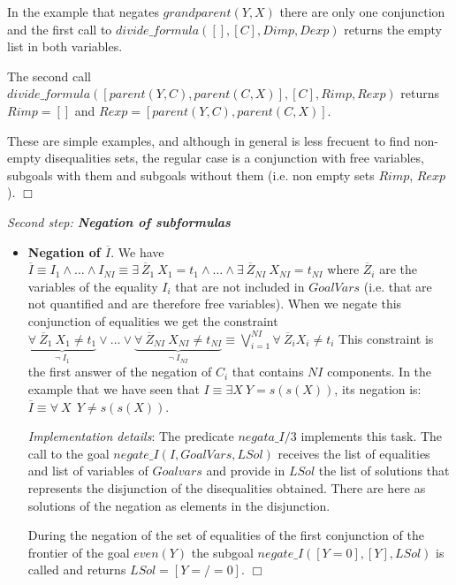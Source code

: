 \documentclass{tlp}
\begin{document}
In the example that negates $grandparent(Y,X)$ there are only one conjunction
and the first call to $divide\_formula([],[C],Dimp,Dexp)$ returns the empty
list in both variables. 

The second call $divide\_formula([parent(Y,C),parent(C,X)],[C],Rimp,Rexp)$
returns $Rimp=[]$ and $Rexp=[parent(Y,C),parent(C,X)]$.

These are simple examples, and although in general is less frecuent to find
non-empty disequalities sets, the regular case is a conjunction with free
variables, subgoals with them and subgoals without them (i.e. non empty sets
$Rimp$, $Rexp$). $\Box$
\medskip

\noindent
{\em Second step: {\bf Negation of subformulas}}

        \begin{itemize}

           \item {\bf Negation of $\overline{I}$}. We have $\overline{I}
           \equiv I_1 \wedge \ldots \wedge I_{NI} \equiv \exists~
           \overline{Z}_1~ X_1 = t_1 \wedge \ldots \wedge \exists~
           \overline{Z}_{NI}~ X_{NI} = t_{NI} $ where
           $\overline{Z}_i$ are the variables of the equality $I_i$ that
           are not included in $GoalVars$ (i.e. that are not quantified
           and are therefore free variables). When we negate this
           conjunction of equalities we get the constraint 
                $
           \underbrace{\forall~ \overline{Z}_1~ X_1 \neq t_1} _{\neg~
           I_1} \vee \ldots \vee \underbrace{\forall~
           \overline{Z}_{NI}~ X_{NI} \neq t_{NI} } _{\neg~ I_{NI}}
           \equiv %
           \bigvee_{i=1}^{NI} \forall~ \overline{Z}_i X_i
           \neq t_i $ 
           This constraint is the first answer of the negation of $C_i$ that
           contains $NI$ components.  In the example that we have seen that $
           I \equiv \exists X ~ Y=s(s(X))$, its negation is: $\overline{I}
           \equiv \forall~ X~~ Y \neq s(s(X))$.

\noindent
\emph{Implementation details}: The predicate $negata\_I/3$ implements this
task. The call to the goal $negate\_I(I,GoalVars,LSol)$ receives the list of
equalities and list of variables of $Goalvars$ and provide in $LSol$ the list
of solutions that represents the disjunction of the disequalities
obtained. There are here as solutions of the negation as elements in the
disjunction.   

During the negation of the set of equalities of the first conjunction of the
frontier of the goal $even(Y)$ the subgoal $negate\_I([Y=0],[Y],LSol)$ is
called and returns $LSol=[Y=/=0]$. $\Box$ 


\end{itemize}
\end{document}

